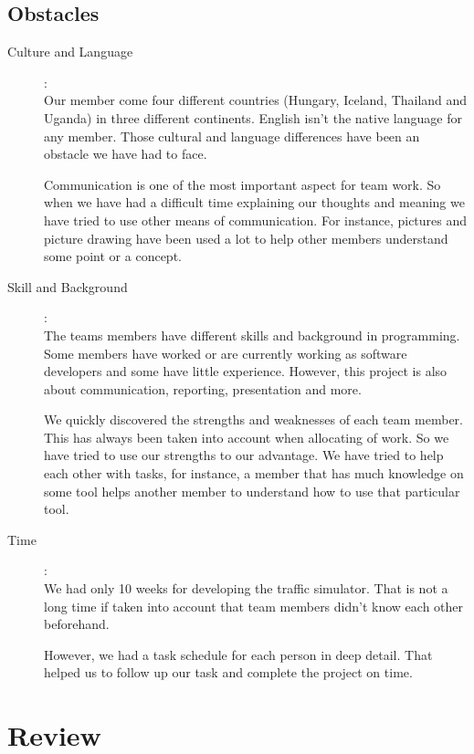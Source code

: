 \documentclass[11pt]{article}
\begin{document}
\subsection{Obstacles}
\begin{description}
\item[Culture and Language]:\\
Our member come four different countries (Hungary, Iceland, Thailand  and Uganda) in three different continents. English isn't the native language for any member. Those cultural and language differences have been an obstacle we have had to face.

Communication is one of the most important aspect for team work. So when we have had a difficult time explaining our thoughts and meaning we have tried to use other means of communication. For instance, pictures and picture drawing have been used a lot to help other members understand some point or a concept.
    
\item[Skill and Background]:\\
The teams members have different skills and background in programming. Some members have worked or are currently working as software developers and some have little experience. However, this project is also about communication, reporting, presentation and more.

We quickly discovered the strengths and weaknesses of each team member. This has always been taken into account when allocating of work. So we have tried to use our strengths to our advantage. We have tried to help each other with tasks, for instance, a member that has much knowledge on some tool helps another member to understand how to use that particular tool. 

\item[Time]:\\
We had only 10 weeks for developing the traffic simulator. That is not a long time if taken into account that team members didn't know each other beforehand.

However, we had a task schedule for each person in deep detail. That helped us to follow up our task and complete the project on time. 
\end{description}

	
\newpage
\section{Review}
\end{document}
